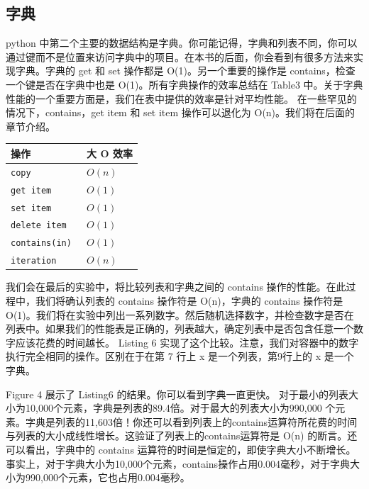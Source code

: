 \subsection{字典}

python 中第二个主要的数据结构是字典。你可能记得，字典和列表不同，你可以通过键而不是位置来访问字典中的项目。在本书的后面，你会看到有很多方法来实现字典。字典的 get 和 set 操作都是 O(1)。另一个重要的操作是 contains，检查一个键是否在字典中也是 O(1)。所有字典操作的效率总结在 Table3 中。关于字典性能的一个重要方面是，我们在表中提供的效率是针对平均性能。 在一些罕见的情况下，contains，get item 和 set item 操作可以退化为 O(n)。我们将在后面的章节介绍。
\begin{table}[htbp]
        \centering
        \begin{tabular}{ll} \hline
                操作&大 O 效率 \\\hline
                \lstinline|copy|         & $O(n)$ \\
                \lstinline|get item     |& $O(1)$ \\
                \lstinline|set item|     & $O(1)$ \\
                \lstinline|delete item|  & $O(1)$ \\
                \lstinline|contains(in)| & $O(1)$ \\
                \lstinline|iteration|    & $O(n)$  \\\hline 
        \end{tabular}
\end{table}

我们会在最后的实验中，将比较列表和字典之间的 contains 操作的性能。在此过程中，我们将确认列表的 contains 操作符是 O(n)，字典的 contains 操作符是 O(1)。我们将在实验中列出一系列数字。然后随机选择数字，并检查数字是否在列表中。如果我们的性能表是正确的，列表越大，确定列表中是否包含任意一个数字应该花费的时间越长。
Listing 6 实现了这个比较。注意，我们对容器中的数字执行完全相同的操作。区别在于在第 7 行上 x 是一个列表，第9行上的 x 是一个字典。



Figure 4 展示了 Listing6 的结果。你可以看到字典一直更快。 对于最小的列表大小为10,000个元素，字典是列表的89.4倍。对于最大的列表大小为990,000 个元素。字典是列表的11,603倍！你还可以看到列表上的contains运算符所花费的时间与列表的大小成线性增长。这验证了列表上的contains运算符是 O(n) 的断言。还可以看出，字典中的 contains 运算符的时间是恒定的，即使字典大小不断增长。事实上，对于字典大小为10,000个元素，contains操作占用0.004毫秒，对于字典大小为990,000个元素，它也占用0.004毫秒。
 

